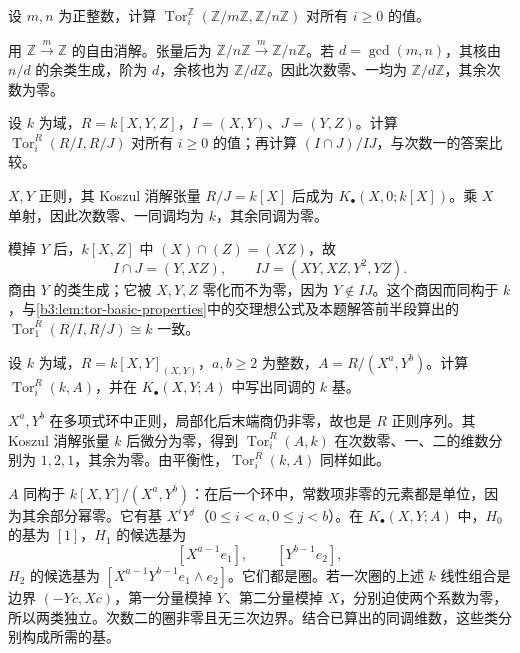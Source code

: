 \begin{exercise}\label{b3:ex:15-tor-integers}
	设 \(m,n\) 为正整数，计算 \(\operatorname{Tor}_i^{\mathbb Z}(\mathbb Z/m\mathbb Z,\mathbb Z/n\mathbb Z)\) 对所有 \(i\ge0\) 的值。
\end{exercise}
\begin{solution}
	用 \(\mathbb Z\xrightarrow{m}\mathbb Z\) 的自由消解。张量后为 \(\mathbb Z/n\mathbb Z\xrightarrow{m}\mathbb Z/n\mathbb Z\)。若 \(d=\gcd(m,n)\)，其核由 \(n/d\) 的余类生成，阶为 \(d\)，余核也为 \(\mathbb Z/d\mathbb Z\)。因此次数零、一均为 \(\mathbb Z/d\mathbb Z\)，其余次数为零。
\end{solution}

\begin{exercise}\label{b3:ex:15-intersection-tor}
	设 \(k\) 为域，\(R=k[X,Y,Z]\)，\(I=(X,Y)\)、\(J=(Y,Z)\)。计算 \(\operatorname{Tor}_i^R(R/I,R/J)\) 对所有 \(i\ge0\) 的值；再计算 \((I\cap J)/IJ\)，与次数一的答案比较。
\end{exercise}
\begin{solution}
	\(X,Y\) 正则，其 Koszul 消解张量 \(R/J=k[X]\) 后成为 \(K_\bullet(X,0;k[X])\)。乘 \(X\) 单射，因此次数零、一同调均为 \(k\)，其余同调为零。

	\ProseParagraphBreak
	模掉 \(Y\) 后，\(k[X,Z]\) 中 \((X)\cap(Z)=(XZ)\)，故
	\[
		I\cap J=(Y,XZ),\qquad IJ=(XY,XZ,Y^2,YZ).
	\]
	商由 \(Y\) 的类生成；它被 \(X,Y,Z\) 零化而不为零，因为 \(Y\notin IJ\)。这个商因而同构于 \(k\)，与\cref{b3:lem:tor-basic-properties}中的交理想公式及本题解答前半段算出的 \(\operatorname{Tor}_1^R(R/I,R/J)\cong k\) 一致。
\end{solution}

\begin{exercise}\label{b3:ex:15-residue-tor}
	设 \(k\) 为域，\(R=k[X,Y]_{(X,Y)}\)，\(a,b\ge2\) 为整数，\(A=R/(X^a,Y^b)\)。计算 \(\operatorname{Tor}_i^R(k,A)\)，并在 \(K_\bullet(X,Y;A)\) 中写出同调的 \(k\) 基。
\end{exercise}
\begin{solution}
	\(X^a,Y^b\) 在多项式环中正则，局部化后末端商仍非零，故也是 \(R\) 正则序列。其 Koszul 消解张量 \(k\) 后微分为零，得到 \(\operatorname{Tor}_i^R(A,k)\) 在次数零、一、二的维数分别为 \(1,2,1\)，其余为零。由平衡性，\(\operatorname{Tor}_i^R(k,A)\) 同样如此。

	\ProseParagraphBreak
	\(A\) 同构于 \(k[X,Y]/(X^a,Y^b)\)：在后一个环中，常数项非零的元素都是单位，因为其余部分幂零。它有基 \(X^iY^j\)（\(0\le i<a,0\le j<b\)）。在 \(K_\bullet(X,Y;A)\) 中，\(H_0\) 的基为 \([1]\)，\(H_1\) 的候选基为
	\[
		[X^{a-1}e_1],\qquad [Y^{b-1}e_2],
	\]
	\(H_2\) 的候选基为 \([X^{a-1}Y^{b-1}e_1\wedge e_2]\)。它们都是圈。若一次圈的上述 \(k\) 线性组合是边界 \((-Yc,Xc)\)，第一分量模掉 \(Y\)、第二分量模掉 \(X\)，分别迫使两个系数为零，所以两类独立。次数二的圈非零且无三次边界。结合已算出的同调维数，这些类分别构成所需的基。
\end{solution}

